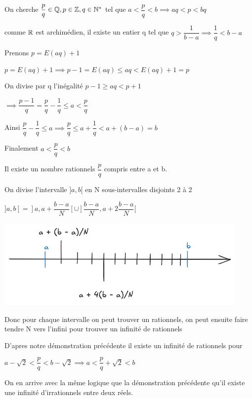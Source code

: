 \documentclass[a4paper, 12pt]{article}
\begin{document}
\begin{demonstration}
    On cherche $\dfrac{p}{q} \in \mathbb{Q}, p \in \mathbb{Z}, q \in \mathbb{N}^*$
    tel que $a \lt \dfrac{p}{q} \lt b \implies aq \lt p \lt bq$

    comme $\mathbb{R}$ est archimédien, il existe un entier q tel que $q \gt \dfrac{1}{b - a} \implies \dfrac{1}{q} \lt b - a$

    Prenons $p = E(aq) + 1$

    $p = E(aq) + 1 \implies p - 1 = E(aq) \leq aq \lt E(aq) + 1 = p$

    \vspace{0.5em}

    On divise par q l'inégalité $p - 1 \geq aq \lt p + 1$

    $\implies \dfrac{p-1}{q} = \dfrac{p}{q} - \dfrac{1}{q} \leq a \lt \dfrac{p}{q}$
    
    Ainsi
    $\dfrac{p}{q} - \dfrac{1}{q} \leq a \implies \dfrac{p}{q} \leq a + \dfrac{1}{q} \lt a + (b-a) = b$

    \begin{rdem}
        Finalement $a \lt \dfrac{p}{q} \lt b$

        Il existe un nombre rationnels $\dfrac{p}{q}$ compris entre a et b.
    \end{rdem}

    On divise l'intervalle $]a,b[$ en N sous-intervalles disjoints 2 à 2
    
    $]a, b[ = ]a, a+\dfrac{b-a}{N}[ \cup ]\dfrac{b-a}{N}, a + 2\dfrac{b-a}{N}[$

    \includegraphics{images/interval.png}

    \begin{rdem}
        Donc pour chaque intervalle on peut trouver un rationnels, on peut ensuite faire tendre N vers l'infini pour trouver un infinité de rationnels
    \end{rdem}
\end{demonstration}

\begin{demonstration}
    D'apres notre démonstration précédente il existe un infinité de rationnels pour

    $a - \sqrt{2} \lt \dfrac{p}{q} \lt b - \sqrt{2} \implies a \lt \dfrac{p}{q} + \sqrt{2} \lt b$

    \begin{rdem}
        On en arrive avec la même logique que la démonstration précédente qu'il existe une infinité d'irrationnels entre deux réels.
    \end{rdem}
\end{demonstration}
        
\end{document}
